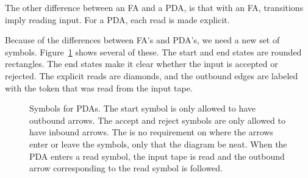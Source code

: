 \documentclass[letterpaper,12pt,openany,reqno]{book}%
\newcommand{\pdaterminal}[3] {\node at (#1) (#2) [rectangle, draw, rounded corners] {#3};}
\newcommand{\pdaread}[3] {\node at (#1) (#2) [diamond, draw] {#3}; }
\newcommand{\pdatransition}[3] {\draw [->] (#1) -- (#2) node [midway, above] {#3};}
\newcommand{\pdarighttransition}[3] {\draw [->] (#1) -- (#2) node [midway, right] {#3};}
\begin{document}
The other difference between an FA and a PDA, is that with an FA, transitions imply reading input. For a PDA, each read is made explicit.

Because of the differences between FA's and PDA's, we need a new set of symbols. Figure~\ref{F.pda.symbols} shows several of these. The start and end states are rounded rectangles. The end states make it clear whether the input is accepted or rejected. The explicit reads are diamonds, and the outbound edges are labeled with the token that was read from the input tape.

\begin{figure}[hbt]
\centering
{}

\caption[Symbols for PDAs]{Symbols for PDAs. The start symbol is only allowed to have outbound arrows. The accept and reject symbols are only allowed to have inbound arrows. The is no requirement on where the arrows enter or leave the symbols, only that the diagram be neat. When the PDA enters a read symbol, the input tape is read and the outbound arrow corresponding to the read symbol is followed.}
\label{F.pda.symbols}
\end{figure}
\end{document}
